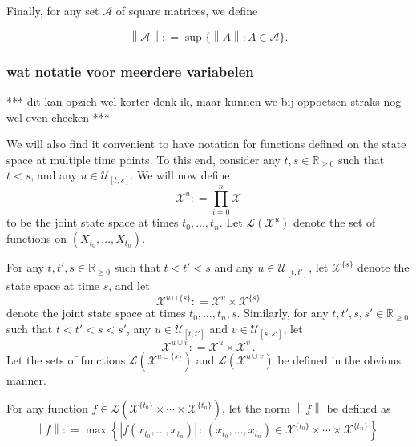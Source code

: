\documentclass[10pt]{paper}
\theoremstyle{definition}
\newcommand{\reals}{\mathbb{R}}
\newcommand{\realsnonneg}{\reals_{\geq 0}}
\newcommand{\states}{\mathcal{X}}
\newcommand{\gambles}{\mathcal{L}}
\newcommand{\norm}[1]{\left\lVert #1 \right\rVert}
\newcommand{\abs}[1]{\left\vert #1 \right\vert}
\newcommand{\coloneqq}{:\!=}
\begin{document}
\noindent
Finally, for any set $\mathcal{A}$ of square matrices, we define

\begin{equation*}
\norm{\mathcal{A}}\coloneqq\sup\{\norm{A}\colon A\in\mathcal{A}\}.
\end{equation*}

\subsubsection{wat notatie voor meerdere variabelen}\label{sec:multivar_notation}

*** dit kan opzich wel korter denk ik, maar kunnen we bij oppoetsen straks nog wel even checken ***

We will also find it convenient to have notation for functions defined on the state space at multiple time points.
To this end, consider any $t,s\in\realsnonneg$ such that $t<s$, and any $u\in\mathcal{U}_{[t,s]}$. We will now define
\begin{equation*}
\states^u\coloneqq \prod_{i=0}^n\states
\end{equation*}
to be the joint state space at times $t_0,\ldots,t_n$. Let $\gambles(\states^u)$ denote the set of functions on $(X_{t_0},\ldots,X_{t_n})$.

For any $t,t',s\in\realsnonneg$ such that $t<t'<s$ and any $u\in\mathcal{U}_{[t,t']}$, let $\states^{\{s\}}$ denote the state space at time $s$, and let
\begin{equation*}
\states^{u\cup\{s\}} \coloneqq \states^u\times\states^{\{s\}}
\end{equation*}
denote the joint state space at times $t_0,\ldots,t_n,s$. Similarly, for any $t,t',s,s'\in\realsnonneg$ such that $t<t'<s<s'$, any $u\in\mathcal{U}_{[t,t']}$ and $v\in\mathcal{U}_{[s,s']}$, let
\begin{equation*}
\states^{u\cup v}\coloneqq\states^u\times\states^v\,.
\end{equation*}
Let the sets of functions $\gambles(\states^{u\cup\{s\}})$ and $\gambles(\states^{u\cup v})$ be defined in the obvious manner.

For any function $f\in\gambles(\states^{\{t_0\}}\times\cdots\times\states^{\{t_n\}})$, let the norm $\norm{f}$ be defined as
\begin{equation*}
\norm{f} \coloneqq \max\left\{ \abs{f(x_{t_0},\ldots,x_{t_n})}\,:\,(x_{t_0},\ldots,x_{t_n})\in \states^{\{t_0\}}\times\cdots\times\states^{\{t_n\}}\right\}\,.
\end{equation*}
\end{document}
